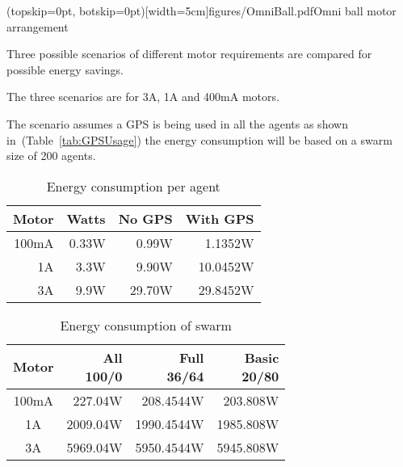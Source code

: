 \documentclass{ieeeaccess}
\begin{document}

\Figure[t!](topskip=0pt, botskip=0pt)[width=5cm]{figures/OmniBall.pdf}{Omni ball motor arrangement\label{fig:OmniBall}}

Three possible scenarios of different motor requirements are compared for possible energy savings.

The three scenarios are for 3A, 1A and 400mA motors.

The scenario assumes a GPS is being used in all the agents as shown in~(Table~\ref{tab:GPSUsage}) the energy consumption will be based on a swarm size of 200 agents.

\begin{table}
\begin{center}
\begin{tabular}{| r | r | r | r |}
\hline
Motor & Watts  & No GPS & With GPS \\ \hline
100mA &  0.33W &  0.99W & 1.1352W\\ \hline
1A    &  3.3W  &  9.90W & 10.0452W\\ \hline
3A    &  9.9W  & 29.70W & 29.8452W\\ \hline
\end{tabular}\caption{Energy consumption per agent} \label{tab:Energy1}
\end{center}
\end{table}

\begin{table}
\begin{center}
\begin{tabular}{| c | r | r | r |}
\hline
{\parbox{1.5cm}{\centering Motor}} & {\parbox{1cm}{\centering All\\100/0}} & {\parbox{1.5cm}{\centering Full\\36/64}} & {\parbox{1.5cm}{\centering Basic \\20/80}} \\ \hline
100mA &  227.04W &  208.4544W &  203.808W\\ \hline
1A    & 2009.04W & 1990.4544W & 1985.808W\\ \hline
3A    & 5969.04W & 5950.4544W & 5945.808W\\ \hline
\end{tabular}\caption{Energy consumption of swarm} \label{tab:Energy2}
\end{center}
\end{table}
\end{document}

